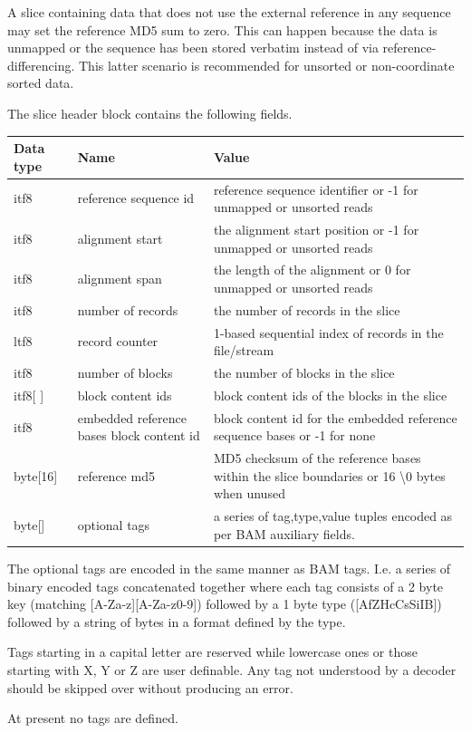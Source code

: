 \documentclass[a4paper]{article}
\begin{document}
A slice containing data that does not use the external reference in
any sequence may set the reference MD5 sum to zero.  This can happen
because the data is unmapped or the sequence has been stored verbatim
instead of via reference-differencing.  This latter scenario is
recommended for unsorted or non-coordinate sorted data.

The slice header block contains the following fields.

\begin{tabular}{|l|l|>{\raggedright}p{200pt}|}
\hline
\textbf{Data type} & \textbf{Name} & \textbf{Value}\tabularnewline
\hline
itf8 & reference sequence id & reference sequence identifier or -1 for unmapped 
or unsorted reads\tabularnewline
\hline
itf8 & alignment start & the alignment start position or -1 for unmapped or unsorted 
reads\tabularnewline
\hline
itf8 & alignment span & the length of the alignment or 0 for unmapped or unsorted 
reads\tabularnewline
\hline
itf8 & number of records & the number of records in the slice\tabularnewline
\hline
ltf8 & record counter & 1-based sequential index of records in the file/stream\tabularnewline
\hline
itf8 & number of blocks & the number of blocks in the slice\tabularnewline
\hline
itf8[ ] & block content ids & block content ids of the blocks in the slice\tabularnewline
\hline
itf8 & embedded reference bases block content id & block content id for the embedded 
reference sequence bases or -1 for none\tabularnewline
\hline
byte[16] & reference md5 & MD5 checksum of the reference bases within the slice 
boundaries or 16 \textbackslash{}0 bytes when unused\tabularnewline
\hline
byte[] & optional tags & a series of tag,type,value tuples encoded as
per BAM auxiliary fields.\tabularnewline
\hline
\end{tabular}

The optional tags are encoded in the same manner as BAM tags.  I.e. a
series of binary encoded tags concatenated together where each tag
consists of a 2 byte key (matching [A-Za-z][A-Za-z0-9]) followed by a
1 byte type ([AfZHcCsSiIB]) followed by a string of bytes in a format
defined by the type.

Tags starting in a capital letter are reserved while lowercase ones or
those starting with X, Y or Z are user definable.  Any tag not
understood by a decoder should be skipped over without producing an
error.

At present no tags are defined.

%
% 
\end{document}
